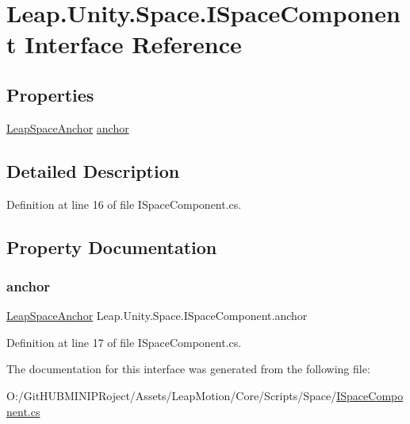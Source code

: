 \hypertarget{interface_leap_1_1_unity_1_1_space_1_1_i_space_component}{}\section{Leap.\+Unity.\+Space.\+I\+Space\+Component Interface Reference}
\label{interface_leap_1_1_unity_1_1_space_1_1_i_space_component}
\subsection*{Properties}
\begin{DoxyCompactItemize}
\item 
\mbox{\hyperlink{class_leap_1_1_unity_1_1_space_1_1_leap_space_anchor}{Leap\+Space\+Anchor}} \mbox{\hyperlink{interface_leap_1_1_unity_1_1_space_1_1_i_space_component_aa8e8762d2a71655cd50455d87e6a9ef4}{anchor}}
\end{DoxyCompactItemize}


\subsection{Detailed Description}


Definition at line 16 of file I\+Space\+Component.\+cs.



\subsection{Property Documentation}
\mbox{\label{interface_leap_1_1_unity_1_1_space_1_1_i_space_component_aa8e8762d2a71655cd50455d87e6a9ef4}} 
\subsubsection{\texorpdfstring{anchor}{anchor}}
{\footnotesize\ttfamily \mbox{\hyperlink{class_leap_1_1_unity_1_1_space_1_1_leap_space_anchor}{Leap\+Space\+Anchor}} Leap.\+Unity.\+Space.\+I\+Space\+Component.\+anchor\hspace{0.3cm}{\ttfamily [get]}}



Definition at line 17 of file I\+Space\+Component.\+cs.



The documentation for this interface was generated from the following file\+:\begin{DoxyCompactItemize}
\item 
O\+:/\+Git\+H\+U\+B\+M\+I\+N\+I\+P\+Roject/\+Assets/\+Leap\+Motion/\+Core/\+Scripts/\+Space/\mbox{\hyperlink{_i_space_component_8cs}{I\+Space\+Component.\+cs}}\end{DoxyCompactItemize}
